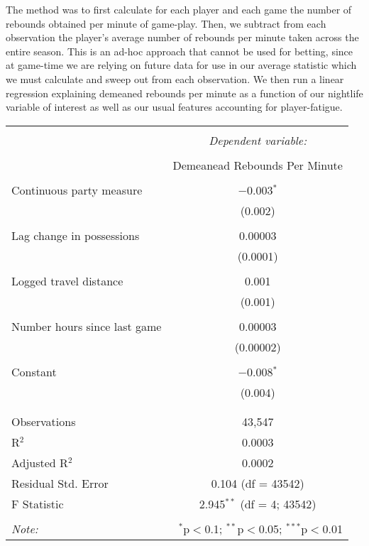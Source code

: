 \documentclass[letterpaper,12pt]{article}
\begin{document}
The method was to first calculate for each player and each game the number of rebounds obtained
per minute of game-play. Then, we subtract from each observation the player's average number of rebounds per minute taken across the entire season.
This is an ad-hoc approach that cannot be used for betting, since at game-time we are relying on future data for use in our average statistic which we must calculate and sweep out from each observation. We then run a linear regression 
explaining demeaned rebounds per minute as a function of our nightlife variable of interest
as well as our usual features accounting for player-fatigue.

\begin{tabular}{@{\extracolsep{5pt}}lc}  \\[-1.8ex]\hline  \hline \\[-1.8ex]   & \multicolumn{1}{c}{\textit{Dependent variable:}} \\  \cline{2-2}  \\[-1.8ex] & Demeanead Rebounds Per Minute \\  \hline \\[-1.8ex]   Continuous party measure & $-$0.003$^{*}$ \\    & (0.002) \\    & \\   Lag change in possessions & 0.00003 \\    & (0.0001) \\    & \\   Logged travel distance & 0.001 \\    & (0.001) \\    & \\   Number hours since last game & 0.00003 \\    & (0.00002) \\    & \\   Constant & $-$0.008$^{*}$ \\    & (0.004) \\    & \\  \hline \\[-1.8ex]  Observations & 43,547 \\  R$^{2}$ & 0.0003 \\  Adjusted R$^{2}$ & 0.0002 \\  Residual Std. Error & 0.104 (df = 43542) \\  F Statistic & 2.945$^{**}$ (df = 4; 43542) \\  \hline  \hline \\[-1.8ex]  \textit{Note:}  & \multicolumn{1}{r}{$^{*}$p$<$0.1; $^{**}$p$<$0.05; $^{***}$p$<$0.01} \\  \end{tabular}  
\end{document}
